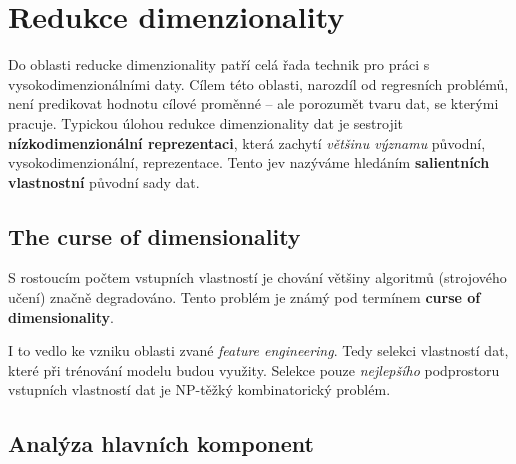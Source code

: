 \section{Redukce dimenzionality}
\label{sec:dimensionality_reduction}

Do oblasti reducke dimenzionality patří celá řada technik pro práci s vysokodimenzionálními daty.
Cílem této oblasti, narozdíl od regresních problémů, není predikovat hodnotu cílové proměnné – ale porozumět tvaru dat, se kterými pracuje.
Typickou úlohou redukce dimenzionality dat je sestrojit \textbf{nízkodimenzionální reprezentaci}, která zachytí \emph{většinu významu} původní, vysokodimenzionální, reprezentace.
Tento jev nazýváme hledáním \textbf{salientních vlastnostní} původní sady dat. \cite{Phillips2021}

\subsection{The curse of dimensionality}
S rostoucím počtem vstupních vlastností je chování většiny algoritmů (strojového učení) značně degradováno.
Tento problém je známý pod termínem \textbf{curse of dimensionality}. \cite{Bellman1957}

I to vedlo ke vzniku oblasti zvané \emph{feature engineering}.
Tedy selekci vlastností dat, které při trénování modelu budou využity.
Selekce pouze \emph{nejlepšího} podprostoru vstupních vlastností dat je NP-těžký kombinatorický problém.

\subsection{Analýza hlavních komponent}
\label{sec:pca}